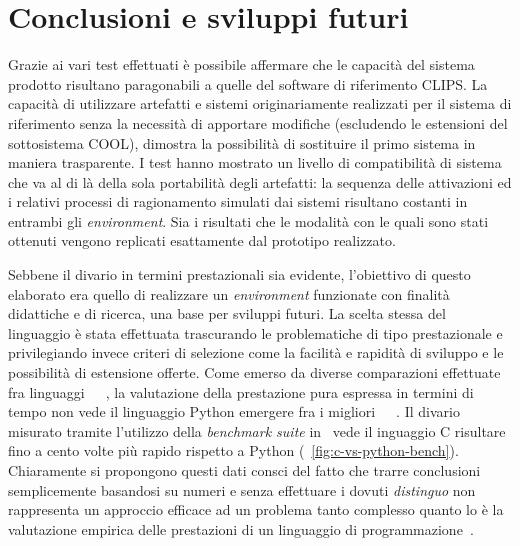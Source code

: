 
\section{Conclusioni e sviluppi futuri}

Grazie ai vari test effettuati è possibile affermare che le capacità del sistema prodotto risultano paragonabili a quelle del software di riferimento CLIPS. 
La capacità di utilizzare artefatti e sistemi originariamente realizzati per il sistema di riferimento senza la necessità di apportare modifiche (escludendo le estensioni del sottosistema COOL), dimostra la possibilità di sostituire il primo sistema in maniera trasparente. I test hanno mostrato un livello di compatibilità di sistema che va al di là della sola portabilità degli artefatti: la sequenza delle attivazioni ed i relativi processi di ragionamento simulati dai sistemi risultano costanti in entrambi gli \emph{environment}. Sia i risultati che le modalità con le quali sono stati ottenuti vengono replicati esattamente dal prototipo realizzato.

Sebbene il divario in termini prestazionali sia evidente, l'obiettivo di questo elaborato era quello di realizzare un \emph{environment} funzionate con finalità didattiche e di ricerca, una base per sviluppi futuri. La scelta stessa del linguaggio è stata effettuata trascurando le problematiche di tipo prestazionale e privilegiando invece criteri di selezione come la facilità e rapidità di sviluppo e le possibilità di estensione offerte. Come emerso da diverse comparazioni effettuate fra linguaggi~\cite{prashant2008}~\cite{prechelt2000}~\cite{naiditch1999}, la valutazione della prestazione pura espressa in termini di tempo non vede il linguaggio Python emergere fra i migliori~\cite{cpybench}~\cite{prashant2008}~\cite{prechelt2000}. Il divario misurato tramite l'utilizzo della \emph{benchmark suite} in~\cite{cpybench} vede il inguaggio C risultare fino a cento volte più rapido rispetto a Python (\figurename~\ref{fig:c-vs-python-bench}). Chiaramente si propongono questi dati consci del fatto che trarre conclusioni semplicemente basandosi su numeri e senza effettuare i dovuti \emph{distinguo} non rappresenta un approccio efficace ad un problema tanto complesso quanto lo è la valutazione empirica delle prestazioni di un linguaggio di programmazione~\cite{algorithms}. 

